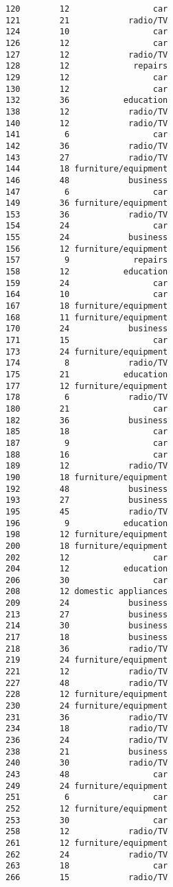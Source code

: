 \documentclass[
]{article}
\begin{document}
\begin{verbatim}
120        12                 car
121        21            radio/TV
124        10                 car
126        12                 car
127        12            radio/TV
128        12             repairs
129        12                 car
130        12                 car
132        36           education
138        12            radio/TV
140        12            radio/TV
141         6                 car
142        36            radio/TV
143        27            radio/TV
144        18 furniture/equipment
146        48            business
147         6                 car
149        36 furniture/equipment
153        36            radio/TV
154        24                 car
155        24            business
156        12 furniture/equipment
157         9             repairs
158        12           education
159        24                 car
164        10                 car
167        18 furniture/equipment
168        11 furniture/equipment
170        24            business
171        15                 car
173        24 furniture/equipment
174         8            radio/TV
175        21           education
177        12 furniture/equipment
178         6            radio/TV
180        21                 car
182        36            business
185        18                 car
187         9                 car
188        16                 car
189        12            radio/TV
190        18 furniture/equipment
192        48            business
193        27            business
195        45            radio/TV
196         9           education
198        12 furniture/equipment
200        18 furniture/equipment
202        12                 car
204        12           education
206        30                 car
208        12 domestic appliances
209        24            business
213        27            business
214        30            business
217        18            business
218        36            radio/TV
219        24 furniture/equipment
221        12            radio/TV
227        48            radio/TV
228        12 furniture/equipment
230        24 furniture/equipment
231        36            radio/TV
234        18            radio/TV
236        24            radio/TV
238        21            business
240        30            radio/TV
243        48                 car
249        24 furniture/equipment
251         6                 car
252        12 furniture/equipment
253        30                 car
258        12            radio/TV
261        12 furniture/equipment
262        24            radio/TV
263        18                 car
266        15            radio/TV

\end{verbatim}
\end{document}
